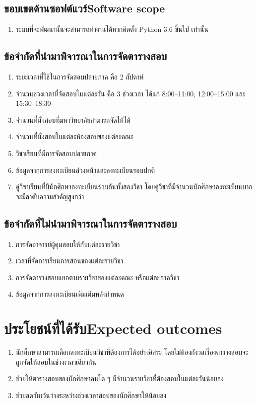 \subsection{\ifcpe ขอบเขตด้านซอฟต์แวร์\else Software scope\fi}
\begin{enumerate}
    \item ระบบที่จะพัฒนานั้นจะสามารถทำงานได้หากติดตั้ง Python 3.6 ขึ้นไป เท่านั้น 
\end{enumerate}
\subsection{ข้อจำกัดที่นำมาพิจารณาในการจัดตารางสอบ}
\begin{enumerate}
    \item ระยะเวลาที่ใช้ในการจัดสอบปลายภาค คือ 2 สัปดาห์
    \item จำนวนช่วงเวลาที่จัดสอบในแต่ละวัน คือ 3 ช่วงเวลา ได้แก่ 8:00--11:00, 12:00--15:00 
    และ 15:30--18:30
    \item จำนวนที่นั่งสอบที่มหาวิทยาลัยสามารถจัดให้ได้
    \item จำนวนที่นั่งสอบในแต่ละห้องสอบของแต่ละคณะ
    \item วิชาเรียนที่มีการจัดสอบปลายภาค
    \item ข้อมูลจากการลงทะเบียนล่วงหน้าและลงทะเบียนรอบปกติ
    \item คู่วิชาเรียนที่มีนักศึกษาลงทะเบียนร่วมกันทั้งสองวิชา โดยคู้่วิชาที่มีจำนวนนักศึกษาลงทะเบียนมาก จะมีลำดับความสำคัญสูงกว่า
\end{enumerate}

\subsection{ข้อจำกัดที่ไม่นำมาพิจารณาในการจัดตารางสอบ}
\begin{enumerate}
    \item การจัดอาจารย์ผู้คุมสอบให้กับแต่ละรายวิชา
    \item เวลาที่จัดการเรียนการสอนของแต่ละรายวิชา
    \item การจัดตารางสอบแยกตามรายวิชาของแต่ละคณะ หรือแต่ละภาควิชา
    \item ข้อมูลจากการลงทะเบียนเพิ่มเติมหลังกำหนด
\end{enumerate}

\section{\ifcpe ประโยชน์ที่ได้รับ\else Expected outcomes\fi}
\begin{enumerate}
    \item นักศึกษาสามารถเลือกลงทะเบียนวิชาที่ต้องการได้อย่างอิสระ โดยไม่ต้องกังวลเรื่องตารางสอบจะถูกจัดให้สอบในช่วงเวลาเดียวกัน
    \item ช่วยให้ตารางสอบของนักศึกษาคนใด ๆ มีจำนวนรายวิชาที่ต้องสอบในแต่ละวันน้อยลง
    \item ช่วยลดวันเว้นว่างระหว่างช่วงเวลาสอบของนักศึกษาให้น้อยลง 
\end{enumerate}

